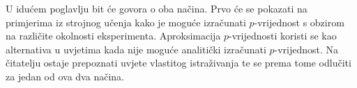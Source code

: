 U idućem poglavlju bit će govora o oba načina. Prvo će se pokazati na primjerima iz strojnog učenja kako je moguće izračunati $p$-vrijednost s obzirom na različite okolnosti eksperimenta. Aproksimacija $p$-vrijednosti koristi se kao alternativa u uvjetima kada nije moguće analitički izračunati $p$-vrijednost. Na čitatelju ostaje prepoznati uvjete vlastitog istraživanja te se prema tome odlučiti za jedan od ova dva načina.

